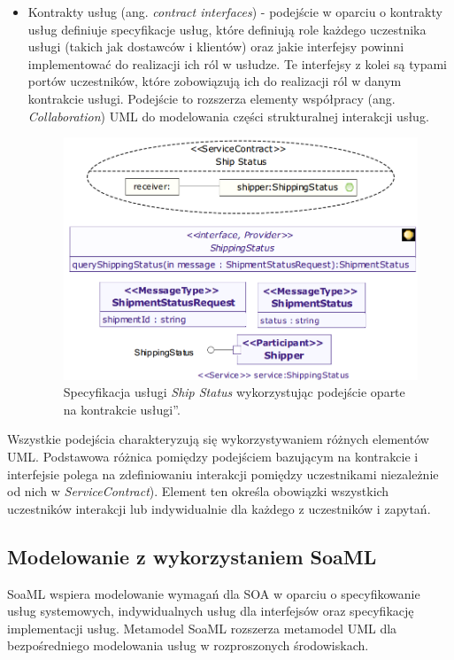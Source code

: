 \begin{itemize}
\item{Kontrakty usług (ang. \emph{contract interfaces}) - podejście w oparciu o kontrakty usług definiuje specyfikacje usług, które definiują role każdego uczestnika usługi (takich jak dostawców i klientów) oraz jakie interfejsy powinni implementować do realizacji ich ról w usłudze. Te interfejsy z kolei są typami portów uczestników, które zobowiązują ich do realizacji ról w danym kontrakcie usługi. Podejście to rozszerza elementy współpracy (ang. \emph{Collaboration}) UML do modelowania części strukturalnej interakcji usług. 
\begin{figure}[h!tbp]
\begin{centering}
\includegraphics[width=11cm]{img/service_contract_based_approach.png}
\caption[Specyfikacja usługi \emph{Ship Status} wykorzystując podejście oparte na \quotedblbase kontrakcie usługi\textquotedblright. ]{Specyfikacja usługi \emph{Ship Status} wykorzystując podejście oparte na \quotedblbase kontrakcie usługi\textquotedblright. \cite{SoaMLErvBase}}\label{service_contract_based_approach}
\end{centering}
\end{figure}
}
\end{itemize}

Wszystkie podejścia charakteryzują się wykorzystywaniem różnych elementów UML. Podstawowa różnica pomiędzy podejściem bazującym na kontrakcie i interfejsie polega na zdefiniowaniu interakcji pomiędzy uczestnikami niezależnie od nich w \emph{ServiceContract}). Element ten określa obowiązki wszystkich uczestników interakcji lub indywidualnie dla każdego z uczestników i zapytań. 

\subsection{Modelowanie z wykorzystaniem SoaML}
SoaML wspiera modelowanie wymagań dla SOA w oparciu o specyfikowanie usług systemowych, indywidualnych usług dla interfejsów oraz specyfikację implementacji usług. Metamodel SoaML \cite{soaml_metamodel} rozszerza metamodel UML dla bezpośredniego modelowania usług w rozproszonych środowiskach. \cite{SoaMLErvBase}


